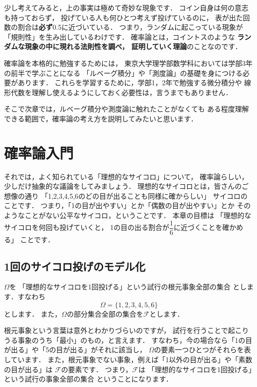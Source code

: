 \documentclass[./main]{subfiles} %
\theoremstyle{definition}
\begin{document}
少し考えてみると，上の事実は極めて奇妙な現象です．
コイン自身は何の意志も持っておらず，
投げている人も何ひとつ考えず投げているのに，
表が出た回数の割合は\textbf{必ず}0.5に近づいている．
つまり，ランダムに起こっている現象が「規則性」を生み出しているわけです．
確率論とは，コイントスのような
\textbf{ランダムな現象の中に現れる法則性を調べ，
証明していく理論}のことなのです．

確率論を本格的に勉強するためには，
東京大学理学部数学科においては学部3年の前半で学ぶことになる
「ルベーグ積分」や「測度論」の基礎を身につける必要があります．
これらを学習するために，学部1，2年で勉強する微分積分や
線形代数を理解し使えるようにしておく必要性は，言うまでもありません．

そこで次章では，ルベーグ積分や測度論に触れたことがなくても
ある程度理解できる範囲で，確率論の考え方を説明してみたいと思います．

\section{確率論入門}

それでは，よく知られている「理想的なサイコロ」について，
確率論らしい，少しだけ抽象的な議論をしてみましょう．
理想的なサイコロとは，皆さんのご想像の通り
「1,2,3,4,5,6のどの目が出ることも同様に確からしい」
サイコロのことです．
つまり，「1の目が出やすい」とか「偶数の目が出やすい」とか
そのようなことがない公平なサイコロ，ということです．
本章の目標は
「理想的なサイコロを何回も投げていくと，
1の目の出る割合が$\dfrac{1}{6}$に近づくことを確かめる」
ことです．

\subsection{1回のサイコロ投げのモデル化}\label{subsec:finiteprobsp}

$\Omega$を
「理想的なサイコロを1回投げる」という試行の根元事象全部の集合
とします．すなわち
\[ \Omega=\{1,2,3,4,5,6\} \]
とします．
また，$\Omega$の部分集合全部の集合を$\mathcal{F}$とします．

根元事象という言葉は意外とわかりづらいのですが，
試行を行うことで起こりうる事象のうち「最小」のもの，と言えます．
すなわち，今の場合なら「1の目が出る」や「5の目が出る」がそれに該当し，
$\Omega$の要素一つひとつがそれらを表しています．
また，根元事象でない事象，例えば「1以外の目が出る」や「素数の目が出る」は
$\mathcal{F}$の要素です．
つまり，$\mathcal{F}$は
「理想的なサイコロを1回投げる」という試行の事象全部の集合
ということになります．
\end{document}
